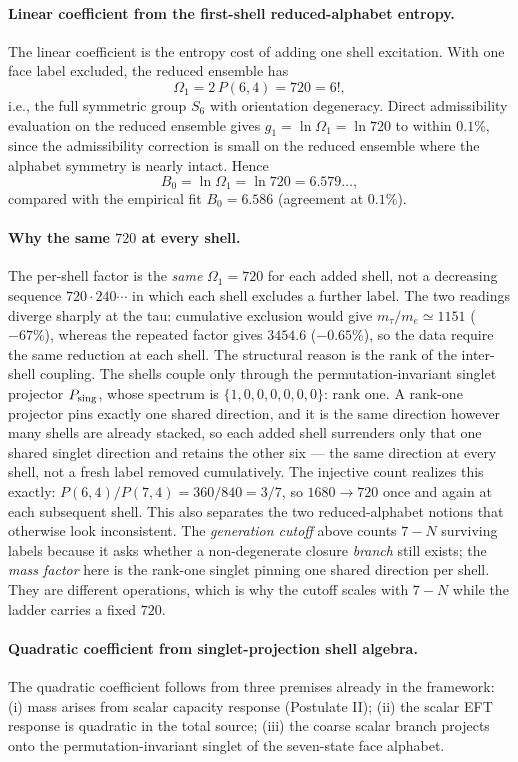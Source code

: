 \documentclass[11pt]{article}
\begin{document}
\paragraph{Linear coefficient from the first-shell reduced-alphabet entropy.}
The linear coefficient is the entropy cost of adding one shell excitation. With one face label excluded, the reduced ensemble has
\[
\Omega_1=2\,P(6,4)=720=6!,
\]
i.e., the full symmetric group $S_6$ with orientation degeneracy. Direct admissibility evaluation on the reduced ensemble gives $g_1=\ln\Omega_1=\ln 720$ to within $0.1\%$, since the admissibility correction is small on the reduced ensemble where the alphabet symmetry is nearly intact. Hence
\[
B_0=\ln\Omega_1=\ln 720=6.579\ldots,
\]
compared with the empirical fit $B_0=6.586$ (agreement at $0.1\%$).

\paragraph{Why the same $720$ at every shell.}
The per-shell factor is the \emph{same} $\Omega_1=720$ for each added shell, not a decreasing sequence $720\cdot240\cdots$ in which each shell excludes a further label. The two readings diverge sharply at the tau: cumulative exclusion would give $m_\tau/m_e\simeq1151$ ($-67\%$), whereas the repeated factor gives $3454.6$ ($-0.65\%$), so the data require the same reduction at each shell. The structural reason is the rank of the inter-shell coupling. The shells couple only through the permutation-invariant singlet projector $P_{\rm sing}$, whose spectrum is $\{1,0,0,0,0,0,0\}$: rank one. A rank-one projector pins exactly one shared direction, and it is the same direction however many shells are already stacked, so each added shell surrenders only that one shared singlet direction and retains the other six --- the same direction at every shell, not a fresh label removed cumulatively. The injective count realizes this exactly: $P(6,4)/P(7,4)=360/840=3/7$, so $1680\to720$ once and again at each subsequent shell. This also separates the two reduced-alphabet notions that otherwise look inconsistent. The \emph{generation cutoff} above counts $7-N$ surviving labels because it asks whether a non-degenerate closure \emph{branch} still exists; the \emph{mass factor} here is the rank-one singlet pinning one shared direction per shell. They are different operations, which is why the cutoff scales with $7-N$ while the ladder carries a fixed $720$.

\paragraph{Quadratic coefficient from singlet-projection shell algebra.}
The quadratic coefficient follows from three premises already in the framework: (i) mass arises from scalar capacity response (Postulate II); (ii) the scalar EFT response is quadratic in the total source; (iii) the coarse scalar branch projects onto the permutation-invariant singlet of the seven-state face alphabet.
\end{document}
